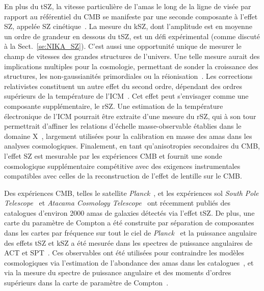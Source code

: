 En plus du tSZ, la vitesse particulière de l'amas le long
de la ligne de visée par rapport au référentiel du CMB se manifeste
par une seconde composante à l'effet SZ, appelée SZ
cinétique~\citep[kSZ;][]{Sunyaev1980}. La mesure du kSZ, dont
l'amplitude est en moyenne un ordre de grandeur en dessous du tSZ, est
un défi expérimental (comme discuté à la
Sect.~\ref{se:NIKA_SZ}). C'est aussi une opportunité unique de mesurer
le champ de vitesses des grandes structures de l'univers. Une telle
mesure aurait des implications multiples pour la cosmologie,
permettant de sonder la croissance des
structures, les non-gaussianités primordiales ou la
réionisation~\citep[voir][par exemple]{SO2019}. 
Les corrections relativistes constituent un autre effet du second
ordre, dépendant des ordres supérieurs de la température de
l'ICM~\citep[voir \emph{e.\,g.}][]{Chluba2012}. Cet effet peut s'envisager comme une composante
supplémentaire, le rSZ. Une estimation de la
température électronique de l'ICM pourrait être
extraite d'une mesure du rSZ, qui à son tour permettrait d'affiner les
relations d'échelle masse-observable établies dans le domaine
X~\citep[voir \emph{e.\,g.}][]{Pratt2009}, largement utilisées pour la
calibration en masse des amas dans les analyses cosmologiques. Finalement, en tant
qu'anisotropies secondaires du CMB, l'effet SZ est mesurable par les
expériences CMB et fournit une sonde cosmologique supplémentaire
compétitive avec des exigences instrumentales compatibles avec celles
de la reconstruction de l'effet de lentille sur le CMB. 

Des expériences CMB, telles le satellite \emph{Planck}~\citep{Planck2016_SZcat}, et les
expériences sol \emph{South Pole Telescope}~\citep[SPT;][]{Bleem2015, Bleem2019}
et \emph{Atacama Cosmology Telescope}~\citep[ACT;][]{Hasselfield2013_ACT_SZ} ont récemment
publiés des catalogues d'environ 2000 amas de galaxies détectés via
l'effet tSZ. De plus, une carte du paramètre de Compton a été
construite par séparation de composantes dans les cartes par fréquence
sur tout le ciel de \emph{Planck}~\citep{Planck2016_ymap} et la
puissance angulaire des effets tSZ et kSZ a été mesurée dans les
spectres de puissance angulaires de ACT et
SPT~\citep[\emph{e.g.}][]{Dunkley2013, George2015}.
Ces observables ont été utilisées pour contraindre les modèles
cosmologiques via l'estimation de l'abondance des amas dans les
catalogues~\citep{Planck_2016_SZ_cosmo, Hasselfield2013_ACT_SZ,
deHaan2016, Bocquet2019, Zulbedia2019}, et via la mesure du spectre de puissance
angulaire et des moments d'ordres supérieurs dans la carte de
paramètre de Compton~\citep{Planck2016_ymap, Hurier2017, Bolliet2018, Bolliet2019,
Salvati2018}. 


